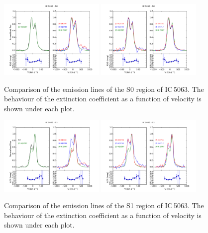 \documentclass[../thesis.tex]{subfiles}
\begin{document}
\begin{figure}
\centering
\includegraphics[width=0.45\textwidth]{images/paper1/IC5063_s0_l1.pdf} \quad
\includegraphics[width=0.45\textwidth]{images/paper1/IC5063_s0_l2.pdf}\\
\caption[]{Comparison of the emission lines of the S0 region of IC\,5063. The behaviour of the extinction coefficient as a function of velocity is shown under each plot.}
\label{fig:s0l1_I}
\end{figure}

\begin{figure}
\centering
\includegraphics[width=0.45\textwidth]{images/paper1/IC5063_s1_l1.pdf} \quad
\includegraphics[width=0.45\textwidth]{images/paper1/IC5063_s1_l2.pdf}\\
\caption[]{Comparison of the emission lines of the S1 region of IC\,5063. The behaviour of the extinction coefficient as a function of velocity is shown under each plot.}
\label{fig:s1l1_I}
\end{figure}
\end{document}
